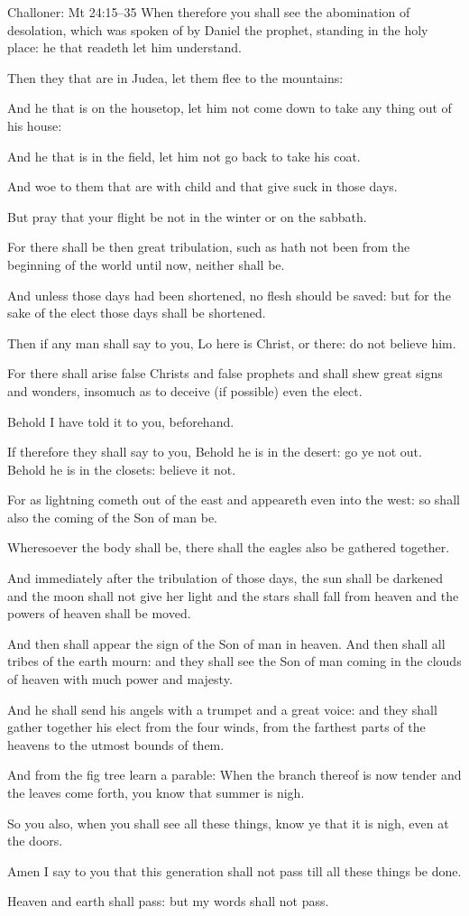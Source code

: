 \begin{englishwitness}{Challoner: Mt 24:15--35}
When therefore you shall see the abomination of desolation, which was
spoken of by Daniel the prophet, standing in the holy place: he that
readeth let him understand.

Then they that are in Judea, let them flee to the mountains:

And he that is on the housetop, let him not come down to take any thing
out of his house:

And he that is in the field, let him not go back to take his coat.

And woe to them that are with child and that give suck in those days.

But pray that your flight be not in the winter or on the sabbath.

For there shall be then great tribulation, such as hath not been from
the beginning of the world until now, neither shall be.

And unless those days had been shortened, no flesh should be saved: but
for the sake of the elect those days shall be shortened.

Then if any man shall say to you, Lo here is Christ, or there: do not believe him.

For there shall arise false Christs and false prophets and shall shew
great signs and wonders, insomuch as to deceive (if possible) even the elect.

Behold I have told it to you, beforehand.

If therefore they shall say to you, Behold he is in the desert: go ye
not out. Behold he is in the closets: believe it not.

For as lightning cometh out of the east and appeareth even into the west:
so shall also the coming of the Son of man be.

Wheresoever the body shall be, there shall the eagles also be gathered together.

And immediately after the tribulation of those days, the sun shall be
darkened and the moon shall not give her light and the stars shall fall
from heaven and the powers of heaven shall be moved.

And then shall appear the sign of the Son of man in heaven. And then
shall all tribes of the earth mourn: and they shall see the Son of man
coming in the clouds of heaven with much power and majesty.

And he shall send his angels with a trumpet and a great voice: and they
shall gather together his elect from the four winds, from the farthest
parts of the heavens to the utmost bounds of them.

And from the fig tree learn a parable: When the branch thereof is now
tender and the leaves come forth, you know that summer is nigh.

So you also, when you shall see all these things, know ye that it is nigh,
even at the doors.

Amen I say to you that this generation shall not pass till all these things be done.

Heaven and earth shall pass: but my words shall not pass.
\end{englishwitness}

